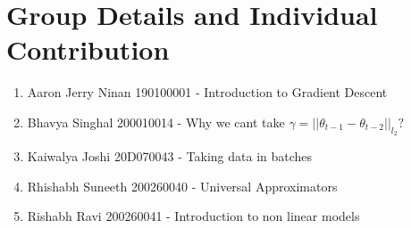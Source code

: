 \documentclass[11pt, twosides]{article}
\begin{document}


\section{Group Details and Individual Contribution}
\begin{enumerate}
    \item Aaron Jerry Ninan 190100001 - Introduction to Gradient Descent
    \item Bhavya Singhal 200010014 - Why we cant take $\gamma = || \theta_{t-1} - \theta_{t-2}||_{l_2}?$
    \item Kaiwalya Joshi 20D070043 - Taking data in batches
    \item Rhishabh Suneeth 200260040 - Universal Approximators
    \item Rishabh Ravi 200260041 - Introduction to non linear models
\end{enumerate}
\end{document}
